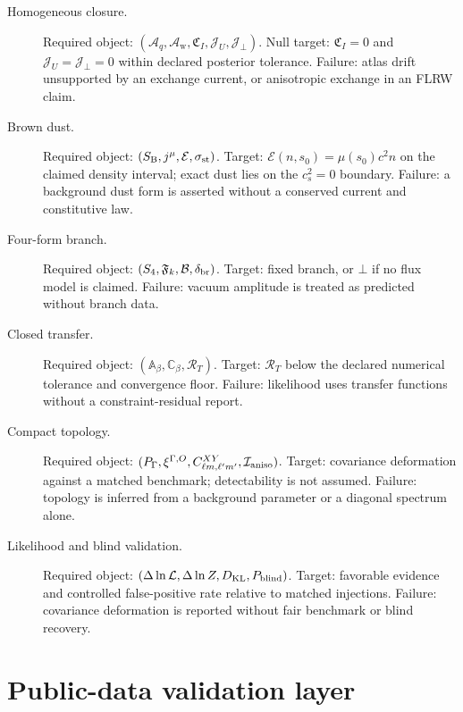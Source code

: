 \documentclass[
  aps,
  prd,
  reprint,
  superscriptaddress,
  floatfix,
  nofootinbib,
  longbibliography
]{revtex4-2}
\theoremstyle{plain}
\theoremstyle{definition}
\theoremstyle{remark}
\newcommand{\Aq}{\mathcal A_q}
\newcommand{\Aw}{\mathcal A_{\mathrm w}}
\newcommand{\KL}{\operatorname{KL}}
\newcommand{\Fcal}{\mathfrak F}
\newcommand{\Ecal}{\mathcal E}
\newcommand{\Bcal}{\mathcal B}
\newcommand{\Ical}{\mathcal I}
\newcommand{\Lcal}{\mathcal L}
\newcommand{\Jcal}{\mathcal J}
\begin{document}
\begin{table}[t]
\caption{Layer-relative precision targets supplied by the IRTC forecast protocol.  A zero means a supplied layer predicts a vanishing defect in the declared null model.  The symbol $\bot$ means the layer is not claimed; it is not a hidden zero.}
\label{tab:precision_targets}
\begin{minipage}{0.96\textwidth}
\small
\begin{description}
\item[Homogeneous closure.] Required object: $(\Aq,\Aw,\mathfrak C_I,\Jcal_U,\Jcal_\perp)$.  Null target: $\mathfrak C_I=0$ and $\Jcal_U=\Jcal_\perp=0$ within declared posterior tolerance.  Failure: atlas drift unsupported by an exchange current, or anisotropic exchange in an FLRW claim.
\item[Brown dust.] Required object: $(S_{\rm B},j^\mu,\Ecal,\sigma_{\rm st})$.  Target: $\Ecal(n,s_0)=\mu(s_0)c^2n$ on the claimed density interval; exact dust lies on the $c_s^2=0$ boundary.  Failure: a background dust form is asserted without a conserved current and constitutive law.
\item[Four-form branch.] Required object: $(S_4,\Fcal_k,\Bcal,\delta_{\rm br})$.  Target: fixed branch, or $\bot$ if no flux model is claimed.  Failure: vacuum amplitude is treated as predicted without branch data.
\item[Closed transfer.] Required object: $(\mathbb A_\beta,\mathbb C_\beta,\mathcal R_T)$.  Target: $\mathcal R_T$ below the declared numerical tolerance and convergence floor.  Failure: likelihood uses transfer functions without a constraint-residual report.
\item[Compact topology.] Required object: $(P_\Gamma,\xi^{\Gamma,O},C_{\ell m,\ell'm'}^{XY},\Ical_{\rm aniso})$.  Target: covariance deformation against a matched benchmark; detectability is not assumed.  Failure: topology is inferred from a background parameter or a diagonal spectrum alone.
\item[Likelihood and blind validation.] Required object: $(\Delta\ln\Lcal,\Delta\ln Z,D_{\KL},P_{\rm blind})$.  Target: favorable evidence and controlled false-positive rate relative to matched injections.  Failure: covariance deformation is reported without fair benchmark or blind recovery.
\end{description}
\end{minipage}
\end{table}

\section{Public-data validation layer}
\end{document}
